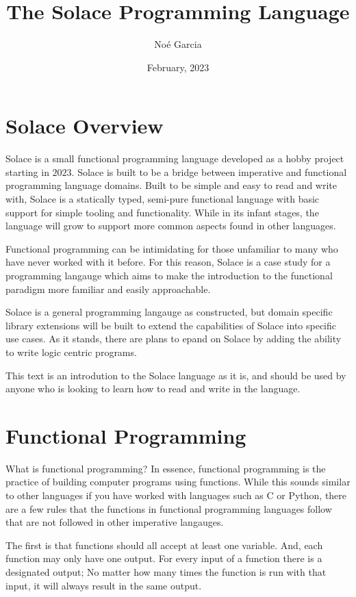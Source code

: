 \documentclass{article}
\title{
	\vspace{2in}
	\textmd{\textbf{The Solace Programming Language}}
	\vspace{3in}
}
\author{No\'e Garcia}
\date{February, 2023}
\begin{document}
\maketitle
\newpage

\section{Solace Overview}
Solace is a small functional programming language developed as a hobby project starting in
$2023$. Solace is built to be a bridge between imperative and functional programming language
domains. Built to be simple and easy to read and write with, Solace is a statically typed,
semi-pure functional language with basic support for simple tooling and functionality. While in
its infant stages, the language will grow to support more common aspects found in other
languages.

Functional programming can be intimidating for those unfamiliar to many who have never worked
with it before. For this reason, Solace is a case study for a programming langauge which aims to
make the introduction to the functional paradigm more familiar and easily approachable.

Solace is a general programming langauge as constructed, but domain specific library extensions
will be built to extend the capabilities of Solace into specific use cases. As it stands, there are
plans to epand on Solace by adding the ability to write logic centric programs.

This text is an introdution to the Solace language as it is, and should be used by anyone who is looking
to learn how to read and write in the language.


\section{Functional Programming}
What is functional programming? In essence, functional programming is the practice of building computer
programs using functions. While this sounds similar to other languages if you have worked with languages
such as C or Python, there are a few rules that the functions in functional programming languages follow
that are not followed in other imperative langauges.

The first is that functions should all accept at least one variable. And, each function may only have one
output. For every input of a function there is a designated output; No matter how many times the function is
run with that input, it will always result in the same output.
\end{document}
